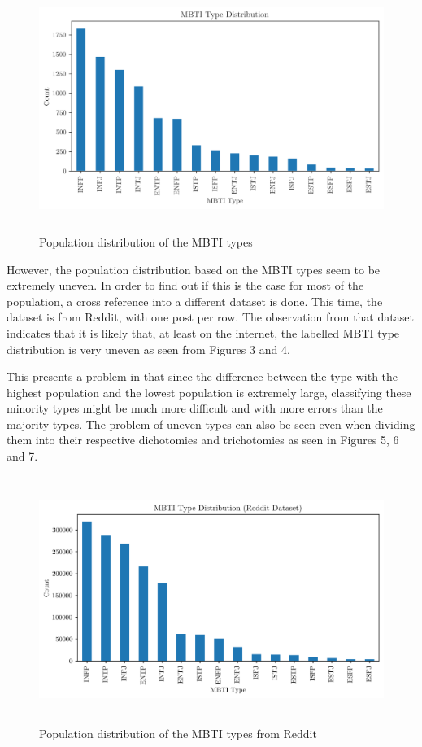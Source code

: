 \documentclass[11pt,a4paper]{article}
\begin{document}
	\begin{figure}[h!]
		\centering
		
		\includegraphics[height=8cm]{../output/visualisations/class_dist}
		
		\caption{Population distribution of the MBTI types}
		
	\end{figure}



	However, the population distribution based on the MBTI types seem to be extremely uneven. In order to find out if this is the case for most of the population, a cross reference into a different dataset is done. This time, the dataset is from Reddit, with one post per row.\autocite{storeyMyersBriggsPersonality2018} The observation from that dataset indicates that it is likely that, at least on the internet, the labelled MBTI type distribution is very uneven as seen from Figures 3 and 4.
	
	This presents a problem in that since the difference between the type with the highest population and the lowest population is extremely large, classifying these minority types might be much more difficult and with more errors than the majority types. The problem of uneven types can also be seen even when dividing them into their respective dichotomies and trichotomies as seen in Figures 5, 6 and 7.

	\begin{figure}[h!]
		\centering
		
		\includegraphics[height=8cm]{../output/visualisations/class_dist_reddit}
		
		\caption{Population distribution of the MBTI types from Reddit}
		
	\end{figure}
\end{document}
